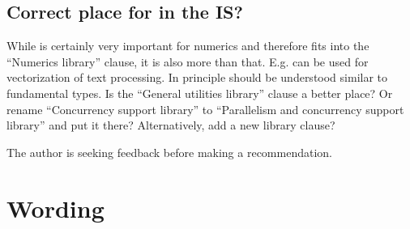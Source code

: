 \subsection{Correct place for  in the IS?}

While  is certainly very important for numerics and therefore fits into the “Numerics library” clause, it is also more than that.
E.g.  can be used for vectorization of text processing.
In principle  should be understood similar to fundamental types.
Is the “General utilities library” clause a better place?
Or rename “Concurrency support library” to “Parallelism and concurrency support library” and put it there?
Alternatively, add a new library clause?

The author is seeking feedback before making a recommendation.

\section{Wording}




